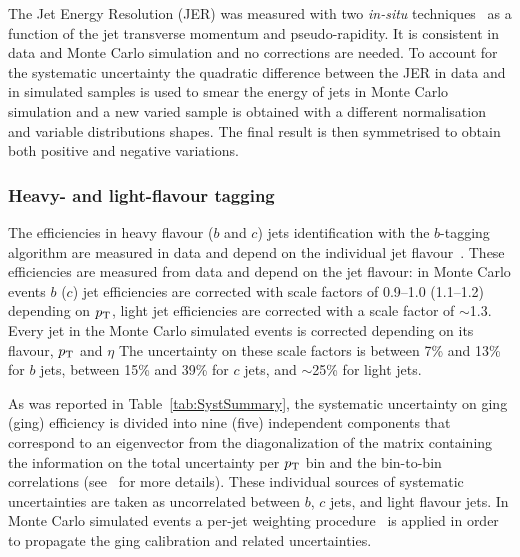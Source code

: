 The Jet Energy Resolution (JER) was measured 
with two {\em in-situ} techniques~\cite{ATLASJetEnergyMeasurement}
as a function of the jet transverse momentum and pseudo-rapidity.
It is consistent in data and Monte Carlo simulation and no corrections
are needed.
To account for the systematic uncertainty the quadratic difference 
between the JER in data and in simulated samples is used
to smear the energy of jets in Monte Carlo simulation and a new
varied sample is obtained with a different normalisation and 
variable distributions shapes. The final result is then symmetrised
to obtain both positive and negative variations.


\subsubsection{Heavy- and light-flavour tagging}
\label{sec:syst_btag}


The efficiencies in heavy flavour ($b$ and $c$) jets identification with
the $b$-tagging algorithm are measured in data and depend on the individual
jet flavour~\cite{BTaggingEfficiency,CTaggingEfficiency,LightTaggingEfficiency}.
These efficiencies are measured from data and depend on the jet flavour:
in Monte Carlo events $b$ ($c$) jet efficiencies are corrected with scale factors
of 0.9--1.0 (1.1--1.2) depending on $\pt$, light jet efficiencies are corrected 
with a  scale factor of $\sim$1.3.
Every jet in the Monte Carlo simulated events is corrected depending
on its flavour, $\pt$ and $\eta$
The uncertainty on these scale factors is 
between 7\% and 13\% for $b$ jets, between 15\% and 39\% for $c$ jets,
and $\sim$25\% for light jets.

As was reported in Table~\ref{tab:SystSummary}, the systematic uncertainty
on \btag ging (\ctag ging) efficiency is divided into nine (five) independent 
components that correspond to an eigenvector from the diagonalization of the
matrix containing the information on the total uncertainty 
per $\pt$ bin and the bin-to-bin correlations (see~\cite[Appendix P]{VHbb} for
more details).
These individual sources of systematic uncertainties 
are taken as uncorrelated between $b$, $c$ jets, and
light flavour jets. In Monte Carlo simulated events 
a per-jet weighting procedure~\cite{IFAEBtagNote}
is applied in order to propagate the \btag ging calibration
and related uncertainties.

